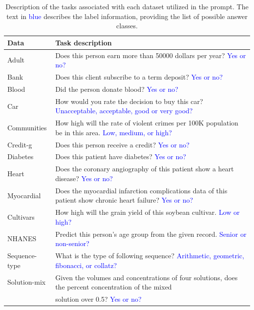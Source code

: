 \documentclass{article}
\theoremstyle{plain}
\theoremstyle{definition}
\theoremstyle{remark}
\begin{document}
\begin{table}[h!]
\caption{Description of the tasks associated with each dataset utilized in the prompt. The text in \textcolor{blue}{blue} describes the label information, providing the list of possible answer classes.}
\begin{tabular}{@{}l|l@{}}
\toprule
Data & Task description \\ \midrule
Adult & Does this person earn more than 50000 dollars per year? \textcolor{blue}{Yes or no?} \\
Bank & Does this client subscribe to a term deposit? \textcolor{blue}{Yes or no?} \\
Blood & Did the person donate blood? \textcolor{blue}{Yes or no?} \\
Car & How would you rate the decision to buy this car? \textcolor{blue}{Unacceptable, acceptable, good or very good?} \\
Communities & How high will the rate of violent crimes per 100K population be in this area. \textcolor{blue}{Low, medium, or high?} \\
Credit-g & Does this person receive a credit? \textcolor{blue}{Yes or no?} \\
Diabetes & Does this patient have diabetes? \textcolor{blue}{Yes or no?} \\
Heart & Does the coronary angiography of this patient show a heart disease? \textcolor{blue}{Yes or no?} \\
Myocardial & Does the myocardial infarction complications data of this patient show chronic heart failure? \textcolor{blue}{Yes or no?} \\ 
Cultivars & How high will the grain yield of this soybean cultivar. \textcolor{blue}{Low or high?} \\
NHANES & Predict this person's age group from the given record. \textcolor{blue}{Senior or non-senior?} \\
Sequence-type & What is the type of following sequence? \textcolor{blue}{Arithmetic, geometric, fibonacci, or collatz?} \\
Solution-mix & Given the volumes and concentrations of four solutions, does the percent concentration of the mixed \\
& solution over 0.5? \textcolor{blue}{Yes or no?} \\
\bottomrule
\end{tabular}
\label{Tab:appendix-description}
\end{table}

\newpage
\end{document}
